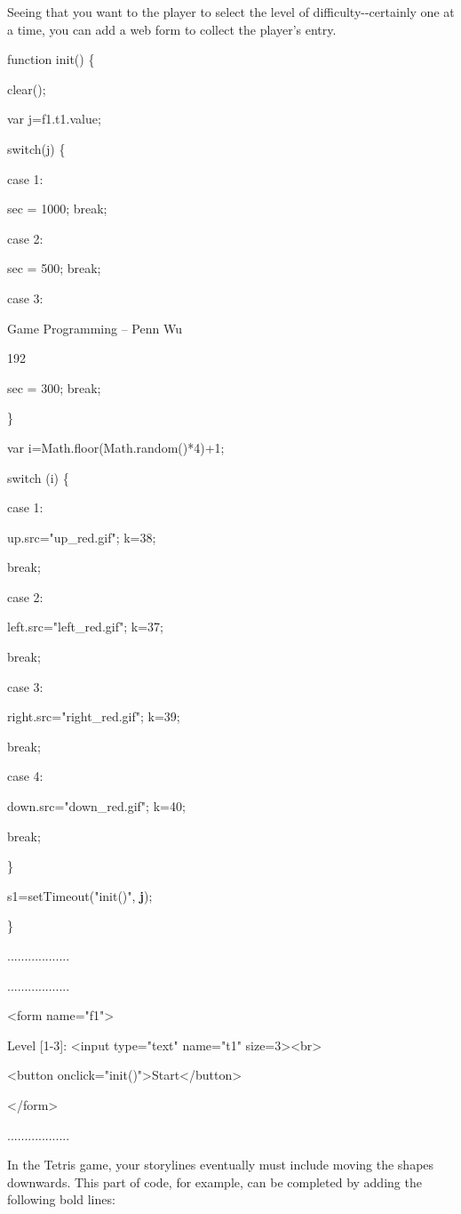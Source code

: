 \documentclass[
]{article}
\begin{document}
Seeing that you want to the player to select the level of
difficulty-\/-certainly one at a time, you can add a web form to collect
the player's entry.

function init() \{

clear();

var j=f1.t1.value;

switch(j) \{

case 1:

sec = 1000; break;

case 2:

sec = 500; break;

case 3:

Game Programming -- Penn Wu

192

\protect\hypertarget{index_split_011.htmlux5cux23p193}{}{} sec = 300;
break;

\}

var i=Math.floor(Math.random()*4)+1;

switch (i) \{

case 1:

up.src="up\_red.gif"; k=38;

break;

case 2:

left.src="left\_red.gif"; k=37;

break;

case 3:

right.src="right\_red.gif"; k=39;

break;

case 4:

down.src="down\_red.gif"; k=40;

break;

\}

s1=setTimeout("init()", \textbf{j});

\}

..................

..................

\textless form name="f1"\textgreater{}

Level {[}1-3{]}: \textless input type="text" name="t1"
size=3\textgreater\textless br\textgreater{}

\textless button
onclick="init()"\textgreater Start\textless/button\textgreater{}

\textless/form\textgreater{}

..................

In the Tetris game, your storylines eventually must include moving the
shapes downwards. This part of code, for example, can be completed by
adding the following bold lines:
\end{document}
